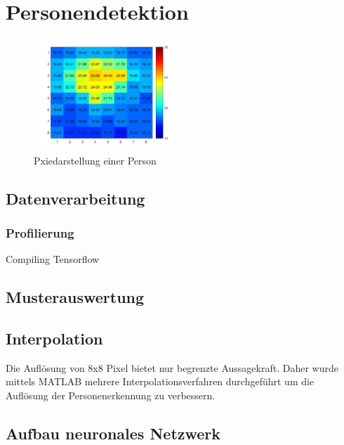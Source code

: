\chapter{Personendetektion}
\label{chap:Personendetektion}



\begin{figure}[H]
	\centering
	\includegraphics[width=0.5\textwidth]
	{fig/person_175_shirt.jpg}
	\caption[Pixeldarstellung einer Person]{Pxiedarstellung einer Person}
	\label{fig:Pixelbild}
\end{figure}


\section{Datenverarbeitung}

\subsection{Profilierung}

\Cross Compiling Tensorflow



\section{Musterauswertung}



\section{Interpolation}

Die Auflösung von 8x8 Pixel bietet nur begrenzte Aussagekraft. Daher wurde mittels MATLAB mehrere Interpolationsverfahren durchgeführt um die Auflösung der Personenerkennung zu verbessern.





\section{Aufbau neuronales Netzwerk}

